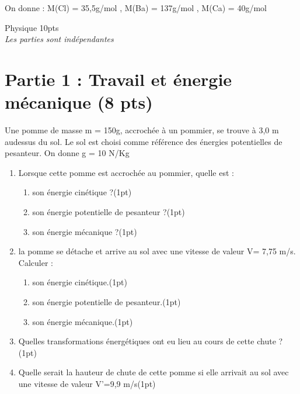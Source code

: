 \documentclass[12pt]{article}
\begin{document}
On donne : M(Cl) = 35,5g/mol , M(Ba) = 137g/mol , M(Ca) = 40g/mol

\begin{center}
    \vspace{4cm}
\hrulefill
\Large{Physique 10pts}
\hrulefill\\
    \emph{Les parties sont indépendantes}
\end{center}

 \section*{Partie 1 :  Travail et énergie mécanique  \dotfill(8 pts)}

Une pomme de masse m = 150g, accrochée à un pommier, se trouve à 3,0 m audessus du sol. Le sol est choisi comme référence des énergies potentielles de
pesanteur.
On donne g = 10 N/Kg

\begin{enumerate}
  \item Lorsque cette pomme est accrochée au pommier, quelle est :
  \begin{enumerate}
  \item son énergie cinétique ?\dotfill(1pt)
  \item son énergie potentielle de pesanteur ?\dotfill(1pt)
  \item son énergie mécanique ?\dotfill(1pt)
\end{enumerate}
  \item la pomme se détache et arrive au sol avec une vitesse de valeur V= 7,75 m/s. Calculer :
 \begin{enumerate}
  \item son énergie cinétique.\dotfill(1pt)
  \item son énergie potentielle de pesanteur.\dotfill(1pt)
  \item son énergie mécanique.\dotfill(1pt)
 \end{enumerate}
  \item  Quelles transformations énergétiques ont eu lieu au cours de cette chute ?\dotfill(1pt)

  \item  Quelle serait la hauteur de chute de cette pomme si elle arrivait au sol avec une
    vitesse de valeur V'=9,9 m/s\dotfill(1pt)

\end{enumerate}
\end{document}

